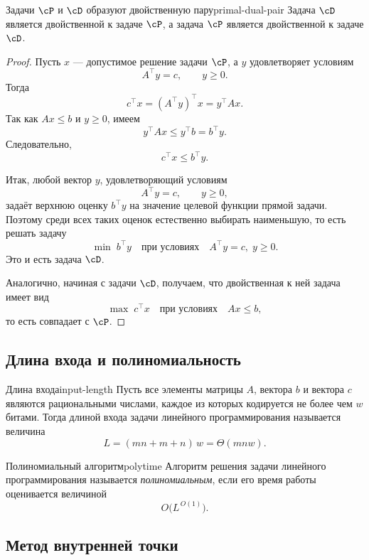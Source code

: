 \begin{Proposition}{Задачи \(\cP\) и \(\cD\) образуют двойственную пару}{primal-dual-pair}
	Задача \(\cD\) является двойственной к задаче \(\cP\), а задача \(\cP\) является двойственной к задаче \(\cD\).
\end{Proposition}

\begin{proof}
	Пусть \(x\) — допустимое решение задачи \(\cP\), а \(y\) удовлетворяет условиям
	\[
	A^\top y = c,\qquad y \ge 0.
	\]
	Тогда
	\[
	c^\top x = (A^\top y)^\top x = y^\top A x.
	\]
	Так как \(Ax \le b\) и \(y \ge 0\), имеем
	\[
	y^\top A x \le y^\top b = b^\top y.
	\]
	Следовательно,
	\[
	c^\top x \le b^\top y.
	\]
	
	Итак, любой вектор \(y\), удовлетворяющий условиям
	\[
	A^\top y = c,\qquad y \ge 0,
	\]
	задаёт верхнюю оценку \(b^\top y\) на значение целевой функции прямой задачи.
	Поэтому среди всех таких оценок естественно выбирать наименьшую, то есть решать задачу
	\[
	\min \; b^\top y
	\quad \text{при условиях} \quad
	A^\top y = c,\; y \ge 0.
	\]
	Это и есть задача \(\cD\).
	
	Аналогично, начиная с задачи \(\cD\), получаем, что двойственная к ней задача имеет вид
	\[
	\max \; c^\top x
	\quad \text{при условиях} \quad
	Ax \le b,
	\]
	то есть совпадает с \(\cP\).
\end{proof}

\subsection{Длина входа и полиномиальность}

\begin{Definition}{Длина входа}{input-length}
	Пусть все элементы матрицы \(A\), вектора \(b\) и вектора \(c\) являются рациональными числами,
	каждое из которых кодируется не более чем \(w\) битами.
	Тогда длиной входа задачи линейного программирования называется величина
	\[
	L = (mn + m + n)\, w = \Theta(m n w).
	\]
\end{Definition}

\begin{Definition}{Полиномиальный алгоритм}{polytime}
	Алгоритм решения задачи линейного программирования называется \emph{полиномиальным},
	если его время работы оценивается величиной
	\[
	O\!\bigl(L^{\,O(1)}\bigr).
	\]
\end{Definition}

\subsection{Метод внутренней точки}

